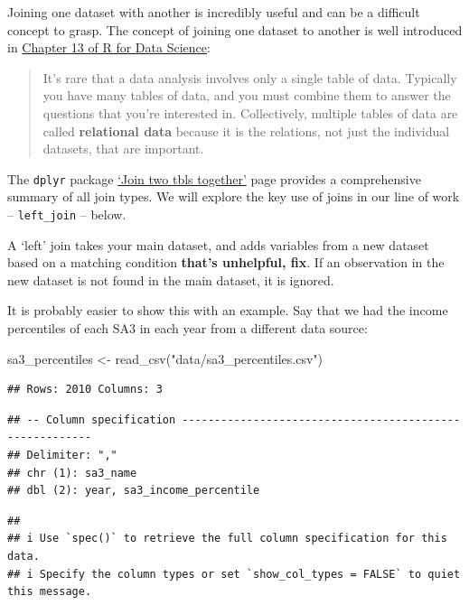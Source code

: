 \documentclass[
]{book}
\newenvironment{Shaded}{\begin{snugshade}}{\end{snugshade}}
\newcommand{\FunctionTok}[1]{\textcolor[rgb]{0.00,0.00,0.00}{#1}}
\newcommand{\NormalTok}[1]{#1}
\newcommand{\OtherTok}[1]{\textcolor[rgb]{0.56,0.35,0.01}{#1}}
\newcommand{\StringTok}[1]{\textcolor[rgb]{0.31,0.60,0.02}{#1}}
\begin{document}
Joining one dataset with another is incredibly useful and can be a difficult concept to grasp. The concept of joining one dataset to another is well introduced in \href{https://r4ds.had.co.nz/relational-data.html}{Chapter 13 of R for Data Science}:

\begin{quote}
It's rare that a data analysis involves only a single table of data. Typically you have many tables of data, and you must combine them to answer the questions that you're interested in. Collectively, multiple tables of data are called \textbf{relational data} because it is the relations, not just the individual datasets, that are important.
\end{quote}

The \texttt{dplyr} package \href{https://dplyr.tidyverse.org/reference/join.html}{`Join two tbls together'} page provides a comprehensive summary of all join types. We will explore the key use of joins in our line of work -- \texttt{left\_join} -- below.

A `left' join takes your main dataset, and adds variables from a new dataset based on a matching condition \textbf{that's unhelpful, fix}. If an observation in the new dataset is not found in the main dataset, it is ignored.

It is probably easier to show this with an example. Say that we had the income percentiles of each SA3 in each year from a different data source:

\begin{Shaded}
\begin{Highlighting}[]
\NormalTok{sa3\_percentiles }\OtherTok{\textless{}{-}} \FunctionTok{read\_csv}\NormalTok{(}\StringTok{"data/sa3\_percentiles.csv"}\NormalTok{)}
\end{Highlighting}
\end{Shaded}

\begin{verbatim}
## Rows: 2010 Columns: 3
\end{verbatim}

\begin{verbatim}
## -- Column specification --------------------------------------------------------
## Delimiter: ","
## chr (1): sa3_name
## dbl (2): year, sa3_income_percentile
\end{verbatim}

\begin{verbatim}
## 
## i Use `spec()` to retrieve the full column specification for this data.
## i Specify the column types or set `show_col_types = FALSE` to quiet this message.
\end{verbatim}
\end{document}

